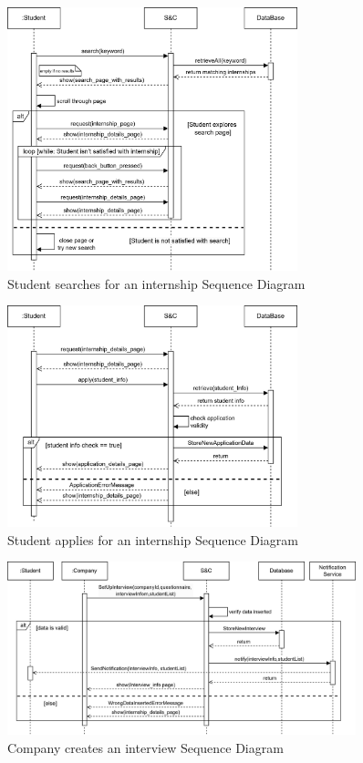 \begin{figure}[H]
    \centering
    \includegraphics[width=0.75\textwidth]{Images/Sequence_Diagrams/searchInt_SD.png}
    \caption{Student searches for an internship Sequence Diagram}
\end{figure}
\begin{figure}[H]
    \centering
    \includegraphics[width=0.75\textwidth]{Images/Sequence_Diagrams/applyInt_SD.png}
    \caption{Student applies for an internship Sequence Diagram}
\end{figure}
\begin{figure}[H]
    \centering
    \includegraphics[width=0.9\textwidth]{Images/Sequence_Diagrams/createIntvw_SD.png}
    \caption{Company creates an interview Sequence Diagram}
\end{figure}
